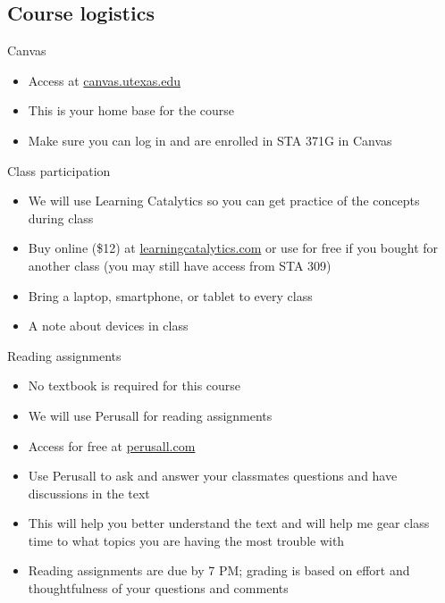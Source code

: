 \documentclass{beamer}\usepackage[]{graphicx}\usepackage[]{color}
\begin{document}
\begin{darkframes}
    \section{Course logistics}

    \begin{frame}{Canvas}
      \begin{itemize}
        \item Access at \url{canvas.utexas.edu}
        \item This is your home base for the course
        \item Make sure you can log in and are enrolled in STA 371G in Canvas
      \end{itemize}
    \end{frame}

    \begin{frame}{Class participation}
      \begin{itemize}
        \item We will use \alert{Learning Catalytics} so you can get practice of the concepts during class
        \item Buy online (\$12) at \url{learningcatalytics.com} or use for free if you bought for another class (you may still have access from STA 309)
        \item Bring a laptop, smartphone, or tablet to every class
        \item A note about devices in class
      \end{itemize}
    \end{frame}

    \begin{frame}{Reading assignments}
      \begin{itemize}
        \item No textbook is required for this course
        \item We will use \alert{Perusall} for reading assignments
        \item Access for free at \url{perusall.com}
        \item Use Perusall to ask and answer your classmates questions and have discussions in the text
        \item This will help you better understand the text and will help me gear class time to what topics you are having the most trouble with
        \item Reading assignments are due by 7 PM; grading is based on effort and thoughtfulness of your questions and comments
      \end{itemize}
    \end{frame}


\end{darkframes}
\end{document}
